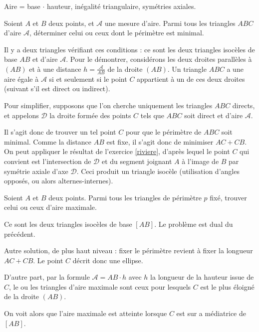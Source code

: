 \begin{exo}

\begin{prerequis} Aire = base $\cdot$ hauteur, inégalité triangulaire, symétries axiales. 
\end{prerequis}
Soient $A$ et $B$ deux points, et $\mathcal A$ une mesure d'aire. Parmi tous les triangles $ABC$ d'aire $\mathcal A$, déterminer celui ou ceux dont le périmètre est minimal.
\begin{sol}
Il y a deux triangles vérifiant ces conditions : ce sont les deux triangles isocèles de base $AB$ et d'aire $\mathcal A$. Pour le démontrer, considérons les deux droites parallèles à $(AB)$ et à une distance $h =\frac{\mathcal A}{ AB}$ de la droite $(AB)$. Un triangle $ABC$ a une aire égale à $\mathcal A$ si et seulement si le point $C$ appartient à un de ces deux droites (suivant s'il est direct ou indirect).

Pour simplifier, supposons que l'on cherche uniquement les triangles $ABC$ directs, et appelons $\mathcal D$ la droite formée des points $C$ tels que $ABC$ soit direct et d'aire $\mathcal A$.

Il s'agit donc de trouver un tel point $C$ pour que le périmètre de $ABC$ soit minimal. Comme la distance $AB$ est fixe, il s'agit donc de minimiser $AC+CB$. On peut appliquer le résultat de l'exercice \ref{riviere}, d'après lequel le point $C$ qui convient est l'intersection de $\mathcal D$ et du segment joignant $A$ à l'image de $B$ par symétrie axiale d'axe $\mathcal D$. Ceci produit un triangle isocèle (utilisation d'angles opposés, ou alors alternes-internes).
\end{sol}
\end{exo}

\begin{exo}
Soient $A$ et $B$ deux points. Parmi tous les triangles de périmètre $p$ fixé, trouver celui ou ceux d'aire maximale.
\begin{sol}


Ce sont les deux triangles isocèles de base $[AB]$. Le problème est dual du précédent.

Autre solution, de plus haut niveau : fixer le périmètre revient à fixer la longueur $AC+CB$. Le point $C$ décrit donc une ellipse.

D'autre part,  par la formule $\mathcal A = AB \cdot h$ avec $h$ la longueur de la hauteur issue de $C$, le  ou les triangles d'aire maximale sont ceux pour lesquels $C$ est le plus éloigné de la droite $(AB)$.

On voit alors que l'aire maximale est atteinte lorsque $C$ est sur a médiatrice de $[AB]$.


\end{sol}
\end{exo}



